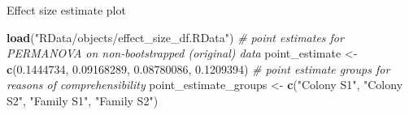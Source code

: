 \documentclass[]{article}
\newenvironment{Shaded}{\begin{snugshade}}{\end{snugshade}}
\newcommand{\KeywordTok}[1]{\textcolor[rgb]{0.13,0.29,0.53}{\textbf{#1}}}
\newcommand{\FloatTok}[1]{\textcolor[rgb]{0.00,0.00,0.81}{#1}}
\newcommand{\StringTok}[1]{\textcolor[rgb]{0.31,0.60,0.02}{#1}}
\newcommand{\CommentTok}[1]{\textcolor[rgb]{0.56,0.35,0.01}{\textit{#1}}}
\newcommand{\NormalTok}[1]{#1}
\begin{document}
Effect size estimate plot

\begin{Shaded}
\begin{Highlighting}[]
\KeywordTok{load}\NormalTok{(}\StringTok{"RData/objects/effect_size_df.RData"}\NormalTok{)}
\CommentTok{# point estimates for PERMANOVA on non-bootstrapped (original) data}
\NormalTok{point_estimate <-}\StringTok{ }\KeywordTok{c}\NormalTok{(}\FloatTok{0.1444734}\NormalTok{, }\FloatTok{0.09168289}\NormalTok{, }\FloatTok{0.08780086}\NormalTok{, }\FloatTok{0.1209394}\NormalTok{)}
\CommentTok{# point estimate groups for reasons of comprehensibility}
\NormalTok{point_estimate_groups <-}\StringTok{ }\KeywordTok{c}\NormalTok{(}\StringTok{"Colony S1"}\NormalTok{, }\StringTok{"Colony S2"}\NormalTok{, }\StringTok{"Family S1"}\NormalTok{, }\StringTok{"Family S2"}\NormalTok{)}


\end{Highlighting}
\end{Shaded}
\end{document}
